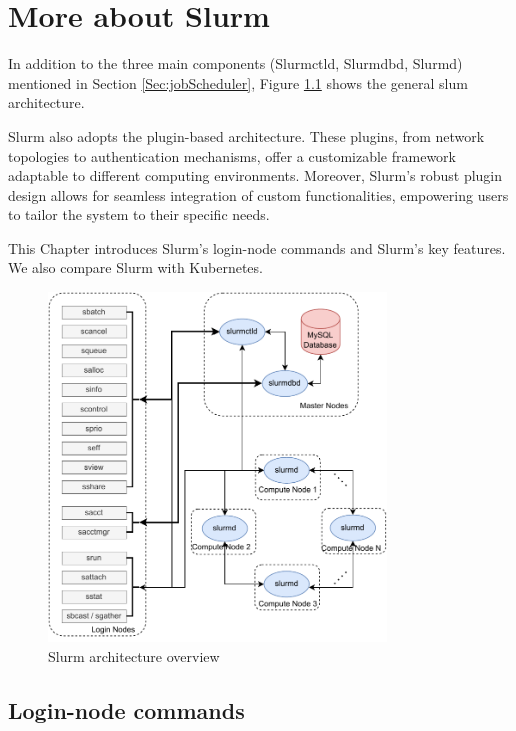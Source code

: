 \chapter{More about Slurm}

In addition to the three main components (Slurmctld, Slurmdbd, Slurmd) mentioned in Section \ref{Sec:jobScheduler}, Figure \ref{fig_slurm_overview} shows the general slum architecture.

Slurm also adopts the plugin-based architecture. These plugins, from network topologies to authentication mechanisms, offer a customizable framework adaptable to different computing environments. Moreover, Slurm's robust plugin design allows for seamless integration of custom functionalities, empowering users to tailor the system to their specific needs.

This Chapter introduces Slurm's login-node commands and Slurm's key features. We also compare Slurm with Kubernetes.

\begin{figure}[tb]
    \centering
    \includegraphics[width=0.8\textwidth]{figures/slurm-overview.pdf}
    \caption{Slurm architecture overview}
    \label{fig_slurm_overview}
\end{figure}



\section{Login-node commands}

